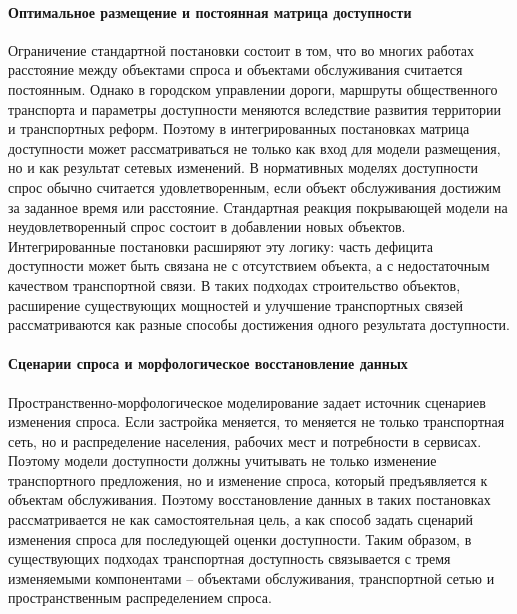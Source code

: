 \paragraph*{Оптимальное размещение и постоянная матрица доступности}
Ограничение стандартной постановки состоит в том, что во многих работах расстояние между объектами спроса и объектами обслуживания считается постоянным. Однако в городском управлении дороги, маршруты общественного транспорта и параметры доступности меняются вследствие развития территории и транспортных реформ. Поэтому в интегрированных постановках матрица доступности может рассматриваться не только как вход для модели размещения, но и как результат сетевых изменений. В нормативных моделях доступности спрос обычно считается удовлетворенным, если объект обслуживания достижим за заданное время или расстояние. Стандартная реакция покрывающей модели на неудовлетворенный спрос состоит в добавлении новых объектов. Интегрированные постановки расширяют эту логику: часть дефицита доступности может быть связана не с отсутствием объекта, а с недостаточным качеством транспортной связи. В таких подходах строительство объектов, расширение существующих мощностей и улучшение транспортных связей рассматриваются как разные способы достижения одного результата доступности.

\paragraph*{Сценарии спроса и морфологическое восстановление данных}
Пространственно-морфологическое моделирование задает источник сценариев изменения спроса. Если застройка меняется, то меняется не только транспортная сеть, но и распределение населения, рабочих мест и потребности в сервисах. Поэтому модели доступности должны учитывать не только изменение транспортного предложения, но и изменение спроса, который предъявляется к объектам обслуживания. Поэтому восстановление данных в таких постановках рассматривается не как самостоятельная цель, а как способ задать сценарий изменения спроса для последующей оценки доступности. Таким образом, в существующих подходах транспортная доступность связывается с тремя изменяемыми компонентами -- объектами обслуживания, транспортной сетью и пространственным распределением спроса.

